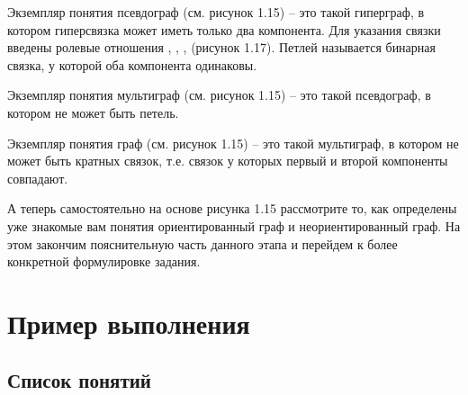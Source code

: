 Экземпляр понятия псевдограф (см. рисунок 1.15) – это такой гиперграф,
в котором гиперсвязка может иметь только два компонента.  Для указания
связки введены ролевые отношения , ,
,  (рисунок 1.17). Петлей называется бинарная
связка, у которой оба компонента одинаковы.

Экземпляр понятия мультиграф (см. рисунок 1.15) – это такой
псевдограф, в котором не может быть петель.
 
Экземпляр понятия граф (см. рисунок 1.15) – это такой мультиграф, в
котором не может быть кратных связок, т.е. связок у которых первый и
второй компоненты совпадают.

А теперь самостоятельно на основе рисунка 1.15 рассмотрите то, как
определены уже знакомые вам понятия ориентированный граф и
неориентированный граф. На этом закончим пояснительную часть данного
этапа и перейдем к более конкретной формулировке задания.

\section{Пример выполнения}
\label{sec:-Graph_onto_example}

\subsection{Список понятий}
\label{sec:-Graph_onto_concept_list}

